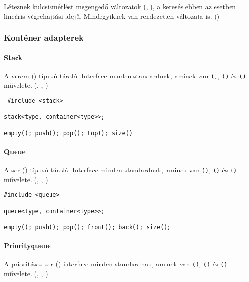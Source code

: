 \documentclass[../../main.tex]{subfiles}
\begin{document}
Léteznek kulcsismétlést megengedő változatok
(, ),
a keresés ebben az esetben lineáris végrehajtási idejű.
Mindegyiknek van rendezetlen változata is.
()

\subsubsection*{Konténer adapterek}

\paragraph*{Stack}

A verem ()  típusú tároló.
Interface minden standardnak, aminek van
\texttt{()}, \texttt{()}
és \texttt{()} művelete.
(, , )

\begin{verbatim}
 #include <stack>

stack<type, container<type>>;

empty(); push(); pop(); top(); size()
\end{verbatim}

\paragraph*{Queue}

A sor ()  típusú tároló.
Interface minden standardnak, aminek van
\texttt{()}, \texttt{()}
és \texttt{()} művelete.
(, , )

\begin{verbatim}
#include <queue>

queue<type, container<type>>;

empty(); push(); pop(); front(); back(); size();
\end{verbatim}

\paragraph*{Priority{}\textunderscore{}queue}

A prioritásos sor ()
interface minden standardnak, aminek van
\texttt{()}, \texttt{()}
és \texttt{()} művelete.
(, , )
\end{document}
